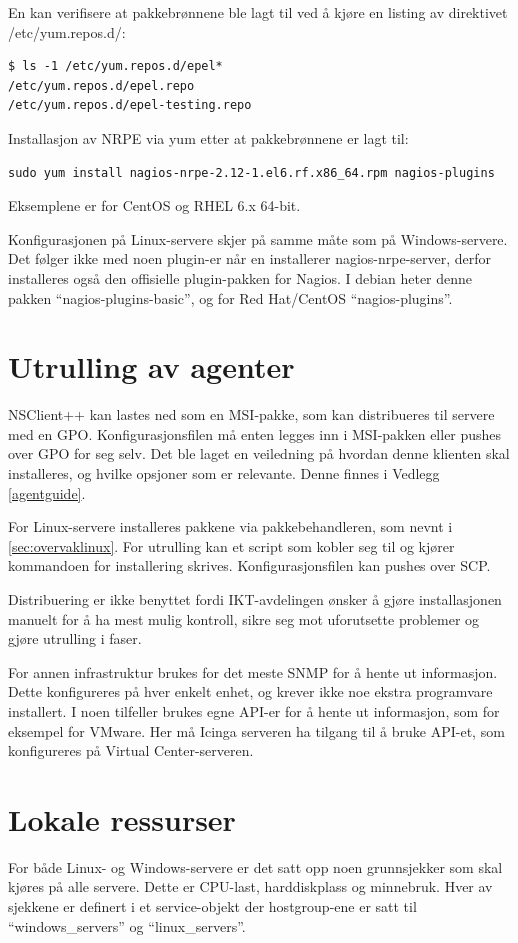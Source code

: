 En kan verifisere at pakkebrønnene ble lagt til ved å kjøre en listing av direktivet /etc/yum.repos.d/:
\begin{lstlisting}[style=example]
$ ls -1 /etc/yum.repos.d/epel*
/etc/yum.repos.d/epel.repo
/etc/yum.repos.d/epel-testing.repo
\end{lstlisting}

Installasjon av NRPE via yum etter at pakkebrønnene er lagt til:
\begin{lstlisting}[style=example]
sudo yum install nagios-nrpe-2.12-1.el6.rf.x86_64.rpm nagios-plugins
\end{lstlisting}

Eksemplene er for CentOS og RHEL 6.x 64-bit.

Konfigurasjonen på Linux-servere skjer på samme måte som på Windows-servere. Det følger ikke med noen plugin-er når en installerer nagios-nrpe-server, derfor installeres også den offisielle plugin-pakken for Nagios. I debian heter denne pakken ``nagios-plugins-basic'', og for Red Hat/CentOS ``nagios-plugins''.

\section{Utrulling av agenter}
NSClient++ kan lastes ned som en MSI-pakke, som kan distribueres til servere med en GPO. Konfigurasjonsfilen må enten legges inn i MSI-pakken eller pushes over GPO for seg selv. Det ble laget en veiledning på hvordan denne klienten skal installeres, og hvilke opsjoner som er relevante. Denne finnes i Vedlegg \ref{agentguide}.

For Linux-servere installeres pakkene via pakkebehandleren, som nevnt i \ref{sec:overvaklinux}. For utrulling kan et script som kobler seg til og kjører kommandoen for installering skrives. Konfigurasjonsfilen kan pushes over SCP.

Distribuering er ikke benyttet fordi IKT-avdelingen ønsker å gjøre installasjonen manuelt for å ha mest mulig kontroll, sikre seg mot uforutsette problemer og gjøre utrulling i faser.
 
For annen infrastruktur brukes for det meste SNMP for å hente ut informasjon. Dette konfigureres på hver enkelt enhet, og krever ikke noe ekstra programvare installert. I noen tilfeller brukes egne API-er for å hente ut informasjon, som for eksempel for VMware. Her må Icinga serveren ha tilgang til å bruke API-et, som konfigureres på Virtual Center-serveren.

\section{Lokale ressurser}\label{sec:lokaleressurser}
For både Linux- og Windows-servere er det satt opp noen grunnsjekker som skal kjøres på alle servere. Dette er CPU-last, harddiskplass og minnebruk. Hver av sjekkene er definert i et service-objekt der hostgroup-ene er satt til ``windows\_servers'' og ``linux\_servers''. 


